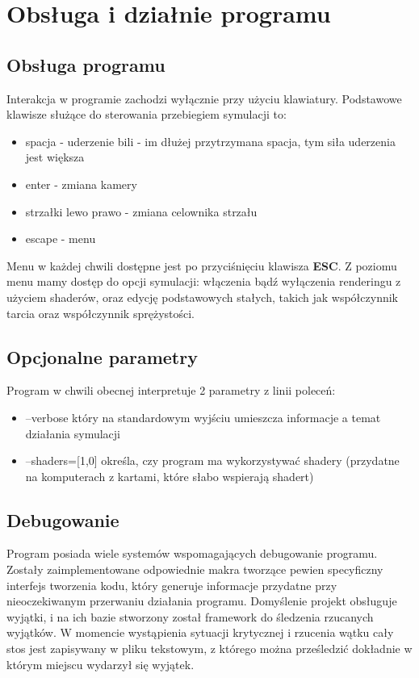 \section{Obsługa i działnie programu}
\subsection{Obsługa programu}

Interakcja w programie zachodzi wyłącznie przy użyciu klawiatury. 
Podstawowe klawisze służące do sterowania przebiegiem symulacji to:
\begin{itemize}
 \item spacja - uderzenie bili - im dłużej przytrzymana spacja, tym siła uderzenia jest większa
 \item enter - zmiana kamery
 \item strzałki lewo prawo - zmiana celownika strzału
 \item escape - menu
\end{itemize}


Menu w każdej chwili dostępne jest po przyciśnięciu klawisza \textbf{ESC}.
Z poziomu menu mamy dostęp do opcji symulacji: włączenia bądź wyłączenia renderingu z użyciem shaderów, oraz
edycję podstawowych stałych, takich jak współczynnik tarcia oraz współczynnik sprężystości.

\subsection{Opcjonalne parametry}

Program w chwili obecnej interpretuje 2 parametry z linii poleceń:
\begin{itemize}
 \item --verbose który na standardowym wyjściu umieszcza informacje a temat działania symulacji
 \item --shaders=[1,0] określa, czy program ma wykorzystywać shadery (przydatne na komputerach z kartami, które słabo wspierają shadert) 
\end{itemize}

\subsection{Debugowanie}

Program posiada wiele systemów wspomagających debugowanie programu. Zostały zaimplementowane odpowiednie makra tworzące
pewien specyficzny interfejs tworzenia kodu, który generuje informacje przydatne przy nieoczekiwanym przerwaniu działania programu. Domyślenie projekt obsługuje wyjątki, i na ich bazie stworzony został framework do śledzenia rzucanych wyjątków. W momencie wystąpienia sytuacji krytycznej i rzucenia wątku cały stos jest zapisywany w pliku tekstowym, z którego można prześledzić dokładnie w którym miejscu wydarzył się wyjątek.